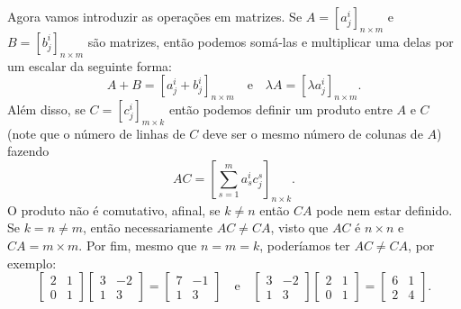 \documentclass{article}
\begin{document}
Agora vamos introduzir as operações em matrizes. Se $A = [a^i_j]_{n \times m}$ e $B = [b^i_j]_{n \times m}$ são matrizes, então podemos somá-las e multiplicar uma delas por um escalar da seguinte forma: \begin{equation}
    A + B = [a^i_j + b^i_j]_{n \times m} \quad \text{e} \quad \lambda A = [\lambda a^i_j]_{n \times m}.
\end{equation} Além disso, se $C = [c^i_j]_{m \times k}$ então podemos definir um produto entre $A$ e $C$ (note que o número de linhas de $C$ deve ser o mesmo número de colunas de $A$) fazendo \begin{equation}
    AC = \left[\sum_{s = 1}^m a^i_s c^s_j\right]_{n \times k}.
\end{equation} O produto não é comutativo, afinal, se $k \neq n$ então $CA$ pode nem estar definido. Se $k = n \neq m$, então necessariamente $AC \neq CA$, visto que $AC$ é $n \times n$ e $CA = m \times m$. Por fim, mesmo que $n = m = k$, poderíamos ter $AC \neq CA$, por exemplo: \begin{equation}
    \begin{bmatrix}
        2 & 1 \\ 0 & 1
    \end{bmatrix} \begin{bmatrix}
        3 & -2 \\ 1 & 3
    \end{bmatrix} = \begin{bmatrix}
        7 & -1 \\ 1 & 3
    \end{bmatrix} \quad \text{e} \quad \begin{bmatrix}
        3 & -2 \\ 1 & 3
    \end{bmatrix} \begin{bmatrix}
        2 & 1 \\ 0 & 1
    \end{bmatrix} = \begin{bmatrix}
        6 & 1 \\ 2 & 4
    \end{bmatrix}.
\end{equation}
\end{document}
